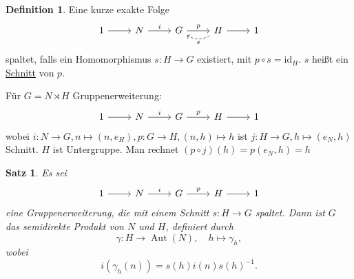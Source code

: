 \documentclass[12pt]{scrartcl} %
\DeclareMathOperator{\Aut}{Aut}
\newtheorem{thm}{Satz}
\theoremstyle{definition}
\newtheorem*{defn}{Definition}
\theoremstyle{remark}
\newcommand{\defi}{\underline}
\begin{document}
\begin{defn}
	Eine kurze exakte Folge
	\[ \begin{tikzcd}
		1 \arrow[r] & N \arrow[r, "i"] & G \arrow[r, "p"] & H \arrow[l, bend left, dashed, "s"] \arrow[r] & 1
	\end{tikzcd} \]
	spaltet, falls ein Homomorphismus $s: H\to G$ existiert, mit $p\circ s = \text{id}_H$.
	$s$ heißt ein \defi{Schnitt} von $p$.
\end{defn}

Für $G=N\rtimes H$ Gruppenerweiterung:
\[ \begin{tikzcd}
		1 \arrow[r] & N \arrow[r,"i"] & G \arrow[r,"p"] & H \arrow[r] & 1
\end{tikzcd} \]
wobei $i: N\to G, n\mapsto (n,e_H), p:G\to H, (n,h)\mapsto h$ ist $j:H\to G, h\mapsto (e_N,h)$ Schnitt. $H$ ist Untergruppe. Man rechnet $(p\circ j)(h)=p(e_N,h)=h$

\begin{thm}
	Es sei
	\[ \begin{tikzcd}
		1 \arrow[r] & N \arrow[r,"i"] & G \arrow[r,"p"] & H \arrow[r] & 1
	\end{tikzcd} \]
	eine Gruppenerweiterung, die mit einem Schnitt $s:H\to G$ spaltet. Dann ist $G$ das semidirekte Produkt von $N$ und $H$, definiert durch 
        \[\gamma: H\to \Aut(N), \quad h\mapsto \gamma_h,\]
        wobei
        \[ i(\gamma_h(n)) = s(h)i(n)s(h)^{-1}.  \]
\end{thm}
\end{document}
